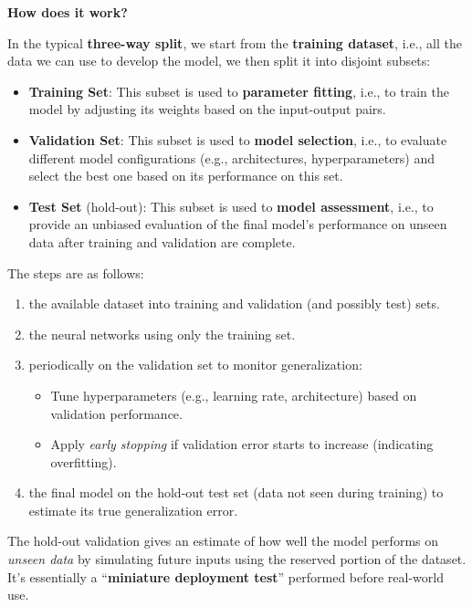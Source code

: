 \highspace
\begin{flushleft}
    \textcolor{Green3}{ \textbf{How does it work?}}
\end{flushleft}
In the typical \textbf{three-way split}, we start from the \textbf{training dataset}, i.e., all the data we can use to develop the model, we then split it into disjoint subsets:
\begin{itemize}
    \item \textbf{Training Set}: This subset is used to \textbf{parameter fitting}, i.e., to train the model by adjusting its weights based on the input-output pairs.
    \item \textbf{Validation Set}: This subset is used to \textbf{model selection}, i.e., to evaluate different model configurations (e.g., architectures, hyperparameters) and select the best one based on its performance on this set.
    \item \textbf{Test Set} (hold-out): This subset is used to \textbf{model assessment}, i.e., to provide an unbiased evaluation of the final model's performance on unseen data after training and validation are complete.
\end{itemize}
The steps are as follows:
\begin{enumerate}
    \item {} the available dataset into training and validation (and possibly test) sets.
    \item {} the neural networks using only the training set.
    \item {} periodically on the validation set to monitor generalization:
    \begin{itemize}
        \item Tune hyperparameters (e.g., learning rate, architecture) based on validation performance.
        \item Apply \emph{early stopping} if validation error starts to increase (indicating overfitting).
    \end{itemize}
    \item {} the final model on the hold-out test set (data not seen during training) to estimate its true generalization error.
\end{enumerate}
The hold-out validation gives an estimate of how well the model performs on \emph{unseen data} by simulating future inputs using the reserved portion of the dataset. It's essentially a ``\textbf{miniature deployment test}'' performed before real-world use.

